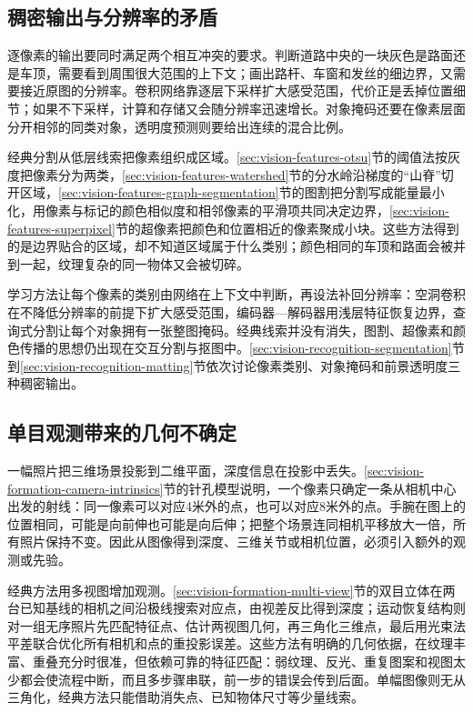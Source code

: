 \subsection{稠密输出与分辨率的矛盾}
\label{sec:vision-recognition-challenge-dense}

逐像素的输出要同时满足两个相互冲突的要求。判断道路中央的一块灰色是路面还是车顶，需要看到周围很大范围的上下文；画出路杆、车窗和发丝的细边界，又需要接近原图的分辨率。卷积网络靠逐层下采样扩大感受范围，代价正是丢掉位置细节；如果不下采样，计算和存储又会随分辨率迅速增长。对象掩码还要在像素层面分开相邻的同类对象，透明度预测则要给出连续的混合比例。

经典分割从低层线索把像素组织成区域。\ref{sec:vision-features-otsu}节的阈值法按灰度把像素分为两类，\ref{sec:vision-features-watershed}节的分水岭沿梯度的“山脊”切开区域，\ref{sec:vision-features-graph-segmentation}节的图割把分割写成能量最小化，用像素与标记的颜色相似度和相邻像素的平滑项共同决定边界，\ref{sec:vision-features-superpixel}节的超像素把颜色和位置相近的像素聚成小块。这些方法得到的是边界贴合的区域，却不知道区域属于什么类别；颜色相同的车顶和路面会被并到一起，纹理复杂的同一物体又会被切碎。

学习方法让每个像素的类别由网络在上下文中判断，再设法补回分辨率：空洞卷积在不降低分辨率的前提下扩大感受范围，编码器—解码器用浅层特征恢复边界，查询式分割让每个对象拥有一张整图掩码。经典线索并没有消失，图割、超像素和颜色传播的思想仍出现在交互分割与抠图中。\ref{sec:vision-recognition-segmentation}节到\ref{sec:vision-recognition-matting}节依次讨论像素类别、对象掩码和前景透明度三种稠密输出。

\subsection{单目观测带来的几何不确定}
\label{sec:vision-recognition-challenge-geometry}

一幅照片把三维场景投影到二维平面，深度信息在投影中丢失。\ref{sec:vision-formation-camera-intrinsics}节的针孔模型说明，一个像素只确定一条从相机中心出发的射线：同一像素可以对应4米外的点，也可以对应8米外的点。手腕在图上的位置相同，可能是向前伸也可能是向后伸；把整个场景连同相机平移放大一倍，所有照片保持不变。因此从图像得到深度、三维关节或相机位置，必须引入额外的观测或先验。

经典方法用多视图增加观测。\ref{sec:vision-formation-multi-view}节的双目立体在两台已知基线的相机之间沿极线搜索对应点，由视差反比得到深度；运动恢复结构则对一组无序照片先匹配特征点、估计两视图几何，再三角化三维点，最后用光束法平差联合优化所有相机和点的重投影误差。这些方法有明确的几何依据，在纹理丰富、重叠充分时很准，但依赖可靠的特征匹配：弱纹理、反光、重复图案和视图太少都会使流程中断，而且多步骤串联，前一步的错误会传到后面。单幅图像则无从三角化，经典方法只能借助消失点、已知物体尺寸等少量线索。

